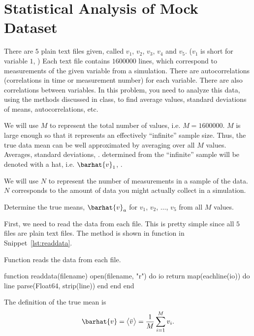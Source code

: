 \section{Statistical Analysis of Mock Dataset}

There are $5$ plain text files given, called $v_1$, $v_2$, $v_3$, $v_4$ and $v_5$. ($v_1$ is
short for variable $1$, \etc{}) Each text file contains $1600000$ lines, which correspond to
measurements of the given variable from a simulation. There are autocorrelations
(correlations in time or measurement number) for each variable. There are also correlations
between variables. In this problem, you need to analyze this data, using the methods
discussed in class, to find average values, standard deviations of means, autocorrelations,
etc.

We will use $M$ to represent the total number of values, i.e. $M = 1600000$. $M$ is large
enough so that it represents an effectively ``infinite'' sample size. Thus, the true data
mean can be well approximated by averaging over all $M$ values. Averages, standard
deviations, \etc. determined from the ``infinite'' sample will be denoted with a hat, i.e.
$\barhat{v}_1$, \etc.

We will use $N$ to represent the number of measurements in a sample of the data. $N$
corresponds to the amount of data you might actually collect in a simulation.

\Question{} Determine the true means, $\barhat{v}_a$ for $v_1$, $v_2$, $\ldots$, $v_5$ from
all $M$ values.

\Answer{}
First, we need to read the data from each file. This is pretty simple since all $5$ files
are plain text files. The method is shown in function  in
Snippet~\ref{lst:readdata}.

\begin{algorithm}[H]
    \caption{Function  reads the data from each file.}
    \label{lst:readdata}
    \begin{juliacode}
        function readdata(filename)
            open(filename, "r") do io
                return map(eachline(io)) do line
                    parse(Float64, strip(line))
                end
            end
        end
    \end{juliacode}
\end{algorithm}

The definition of the true mean is
\begin{equation}
    \barhat{v} = \bigl \langle \bar{v} \bigr \rangle = \frac{ 1 }{ M } \sum_{i=1}^{M} v_i.
\end{equation}

